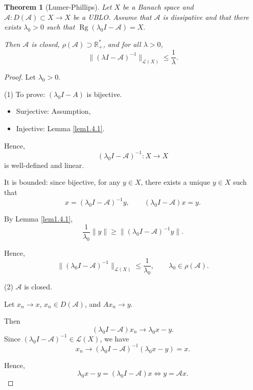 \documentclass[12pt, oneside]{book}
\newtheorem{theo}{Theorem}[section]
\begin{document}
\begin{theo}[Lumer-Phillips]\label{Lumer-Phillips}
Let $X$ be a Banach space and
$
\mathscr{A} : D(\mathscr{A}) \subset X \longrightarrow X
$
be a UBLO.
Assume that $\mathscr{A}$ is dissipative and that there exists $\lambda_0 > 0$
such that
$
\operatorname{Rg}(\lambda_0 I - \mathscr{A}) = X.
$

Then $\mathscr{A}$ is closed, $\rho(\mathscr{A}) \supset \mathbb{R}_+^*$, and
for all $\lambda > 0$,
\vspace{-3mm}
\[
\|(\lambda I - \mathscr{A})^{-1}\|_{\mathcal{L}(X)}
\le \frac{1}{\lambda}.
\tag{1.4}
\]
\end{theo}

\begin{proof} Let $\lambda_0 > 0$.

\medskip

(1) To prove: $(\lambda_0 I - A)$ is bijective.

\medskip

\begin{itemize}
	\item Surjective: Assumption,
	\item Injective: Lemma \ref{lem1.4.1}.
\end{itemize}

Hence,
\[
(\lambda_0 I - \mathscr{A})^{-1} : X \longrightarrow X
\]
is well-defined and linear.

\medskip

It is bounded: since bijective, for any $y \in X$,
there exists a unique $y \in X$ such that
\[
x = (\lambda_0 I - \mathscr{A})^{-1} y,
\qquad
(\lambda_0 I - \mathscr{A})x = y.
\]

By Lemma \ref{lem1.4.1},
\[
\frac{1}{\lambda_0} \|y\|
\ge \|(\lambda_0 I - \mathscr{A})^{-1} y\|.
\]

Hence,
\[
\|(\lambda_0 I - \mathscr{A})^{-1}\|_{\mathcal{L}(X)}
\le \frac{1}{\lambda_0},
\qquad
\lambda_0 \in \rho(\mathscr{A}).
\]

\medskip

(2) $\mathscr{A}$ is closed.

\medskip

Let $x_n \to x$, $x_n \in D(\mathscr{A})$,
and
$
Ax_n \to y.
$

Then
\[
(\lambda_0 I - \mathscr{A})x_n \to \lambda_0 x - y.
\]
Since $(\lambda_0 I - \mathscr{A})^{-1} \in \mathcal{L}(X)$, we have
\[
x_n \longrightarrow (\lambda_0 I - \mathscr{A})^{-1}(\lambda_0 x - y) = x.
\]

Hence,
\[
\lambda_0 x - y = (\lambda_0 I - \mathscr{A})x
\iff y = \mathscr{A}x.
\]


\end{proof}
\end{document}
